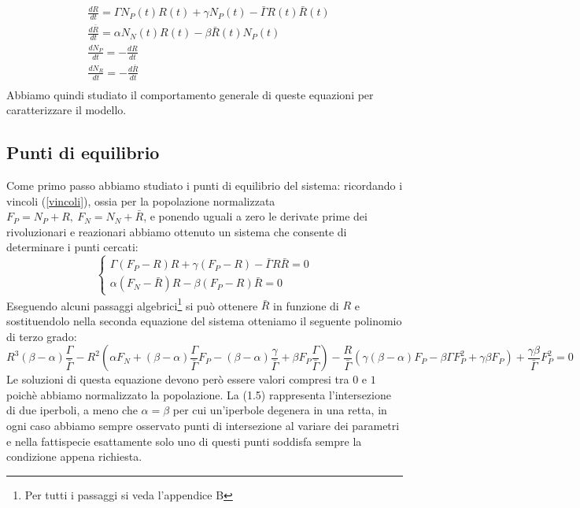 \begin{equation} \label{eq:1.4}
		\begin{aligned}
			&\frac{dR}{dt}=\Gamma N_P(t) R(t)+\gamma N_P(t)-\bar{\Gamma}R(t)\bar{R}(t)\\
		&\frac{d\bar{R}}{dt}=\alpha N_N(t)R(t)-\beta \bar{R}(t)N_P(t)\\
		&\frac{dN_{P}}{dt}= -\frac{dR}{dt}\\
		&\frac{dN_{R}}{dt}= -\frac{d\bar{R}}{dt}\\
		\end{aligned}
\end{equation}
Abbiamo quindi studiato il comportamento generale di queste equazioni per caratterizzare il modello.
\subsection{Punti di equilibrio}
Come primo passo abbiamo studiato i punti di equilibrio del sistema: ricordando i vincoli (\ref{vincoli}), ossia per la popolazione normalizzata $
	F_{P}=N_{P}+R ,\ F_{N}=N_{N}+\bar{R}
$, e ponendo uguali a zero le derivate prime dei rivoluzionari e reazionari abbiamo ottenuto un sistema che consente di determinare i punti cercati:
\begin{equation}
	\begin{cases}
		\Gamma (F_{P}-R)R+\gamma (F_{P}-R)-\bar{\Gamma}R\bar{R}=0\\
		\alpha (F_{N}-\bar{R})R-\beta (F_{P}-R)\bar{R}=0
	\end{cases}
\end{equation}
Eseguendo alcuni passaggi algebrici\footnote{Per tutti i passaggi si veda l'appendice B} si può ottenere $ \bar{R} $ in funzione di $ R $ e sostituendolo nella seconda equazione del sistema otteniamo il seguente polinomio di terzo grado:
\begin{equation}
	R^{3}(\beta - \alpha)\frac{\Gamma}{\bar{\Gamma}}-R^{2}\left(\alpha F_{N}+(\beta - \alpha)\frac{\Gamma}{\bar{\Gamma}}F_{P}-(\beta - \alpha)\frac{\gamma}{\bar{\Gamma}}+\beta F_{P}\frac{\Gamma}{\bar{\Gamma}}\right)-\frac{R}{\bar{\Gamma}}\left(\gamma (\beta - \alpha)F_{P}-\beta \Gamma F^{2}_{P}+\gamma\beta F_{P}\right)+\frac{\gamma\beta}{\bar{\Gamma}}F^{2}_{P}=0
	\label{equilibiro 3g}
\end{equation}
Le soluzioni di questa equazione devono però essere valori compresi tra $0$ e $1$ poichè abbiamo normalizzato la popolazione. La (1.5) rappresenta l'intersezione di due iperboli, a meno che $\alpha=\beta$ per cui un'iperbole degenera in una retta, in ogni caso abbiamo sempre osservato punti di intersezione al variare dei parametri e nella fattispecie esattamente solo uno di questi punti soddisfa sempre la condizione appena richiesta.\\
